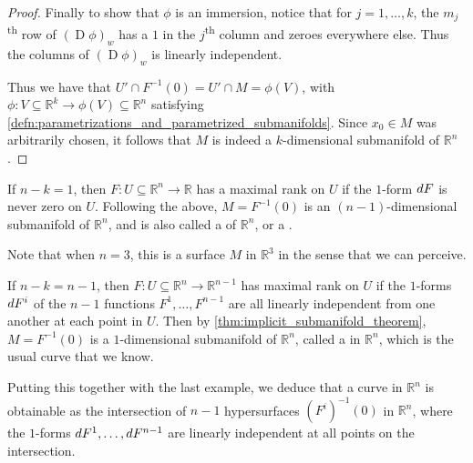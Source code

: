 \documentclass[notoc,notitlepage]{tufte-book}
\DeclareMathOperator{\D}{D}
\begin{document}
\begin{proof}
  Finally to show that $\phi$ is an immersion, notice that for $j = 1, \ldots,
  k$, the $m_j$\textsuperscript{th} row of $(\D \phi)_w$ has a $1$ in the
  $j$\textsuperscript{th} column and zeroes everywhere else. Thus the columns of
  $(\D \phi)_w$ is linearly independent.

  Thus we have that $U' \cap F^{-1}(0) = U' \cap M = \phi(V)$, with $\phi : V
  \subseteq \mathbb{R}^k \to \phi(V) \subseteq \mathbb{R}^n$ satisfying
  \cref{defn:parametrizations_and_parametrized_submanifolds}. Since $x_0 \in M$
  was arbitrarily chosen, it follows that $M$ is indeed a $k$-dimensional
  submanifold of $\mathbb{R}^n$.
\end{proof}

\begin{eg}
  If $n - k = 1$, then $F : U \subseteq \mathbb{R}^n \to \mathbb{R}$ has a
  maximal rank on $U$ if the $1$-form $\mathop{}\!d{F}$ is never zero on $U$. Following
  the above, $M = F^{-1}(0)$ is an $(n - 1)$-dimensional submanifold of
  $\mathbb{R}^n$, and is also called a  of $\mathbb{R}^n$,
  or a .

  Note that when $n = 3$, this is a surface $M$ in $\mathbb{R}^3$ in the sense
  that we can perceive.
\end{eg}

\begin{eg}
  If $n - k = n - 1$, then $F : U \subseteq \mathbb{R}^n \to \mathbb{R}^{n - 1}$
  has maximal rank on $U$ if the $1$-forms $\mathop{}\!d{F}^i$ of the $n - 1$ functions
  $F^1, \ldots, F^{n - 1}$ are all linearly independent from one another at each
  point in $U$. Then by
  \cref{thm:implicit_submanifold_theorem}, $M =
  F^{-1}(0)$ is a $1$-dimensional submanifold of $\mathbb{R}^n$, called a
   in $\mathbb{R}^n$, which is the usual curve that we know.

  Putting this together with the last example, we deduce that a curve in
  $\mathbb{R}^n$ is obtainable as the intersection of $n - 1$ hypersurfaces
  $(F^i)^{-1}(0)$ in $\mathbb{R}^n$, where the $1$-forms $\mathop{}\!d{F}^1, \ldots,
  \mathop{}\!d{F}^{n - 1}$ are linearly independent at all points on the intersection.
\end{eg}
\end{document}
